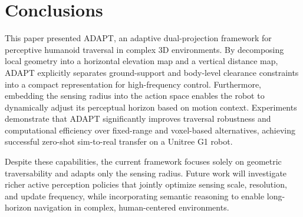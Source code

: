 \section{Conclusions}
This paper presented ADAPT, an adaptive dual-projection framework for perceptive humanoid traversal in complex 3D environments. By decomposing local geometry into a horizontal elevation map and a vertical distance map, ADAPT explicitly separates ground-support and body-level clearance constraints into a compact representation for high-frequency control. Furthermore, embedding the sensing radius into the action space enables the robot to dynamically adjust its perceptual horizon based on motion context. Experiments demonstrate that ADAPT significantly improves traversal robustness and computational efficiency over fixed-range and voxel-based alternatives, achieving successful zero-shot sim-to-real transfer on a Unitree G1 robot.

Despite these capabilities, the current framework focuses solely on geometric traversability and adapts only the sensing radius. Future work will investigate richer active perception policies that jointly optimize sensing scale, resolution, and update frequency, while incorporating semantic reasoning to enable long-horizon navigation in complex, human-centered environments.